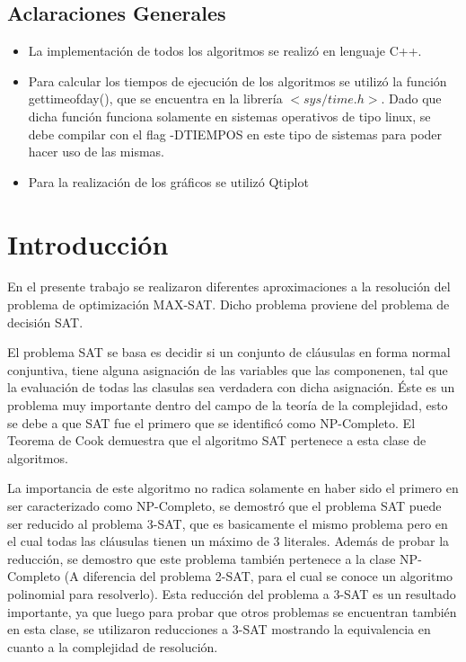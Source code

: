 \documentclass[a4paper,10pt]{article}
\begin{document}
\tableofcontents

\newpage


\begin{center}
\section*{Aclaraciones Generales}

\begin{itemize}
\item La implementación de todos los algoritmos se realizó en lenguaje C++.

\item Para calcular los tiempos de ejecución de los algoritmos se utilizó la función gettimeofday(), que se encuentra en la librería $<sys/time.h>$. Dado que dicha función funciona solamente en sistemas operativos de tipo linux, se debe compilar con el flag -DTIEMPOS en este tipo de sistemas para poder hacer uso de las mismas.

\item Para la realización de los gráficos se utilizó Qtiplot
\end{itemize}

\end{center}

\newpage

\section*{Introducci\'on}

En el presente trabajo se realizaron diferentes aproximaciones a la resoluci\'on del problema de optimizaci\'on MAX-SAT. Dicho problema proviene del problema de decisi\'on SAT. 

El problema SAT se basa es decidir si un conjunto de cl\'ausulas en forma normal conjuntiva, tiene alguna asignaci\'on de las variables que las componenen, tal que la evaluaci\'on de todas las clasulas sea verdadera con dicha asignaci\'on. \'Este es un problema muy importante dentro del campo de la teor\'ia de la complejidad, esto se debe a que SAT fue el primero que se identific\'o como NP-Completo. El Teorema de Cook demuestra que el algoritmo SAT pertenece a esta clase de algoritmos.

La importancia de este algoritmo no radica solamente en haber sido el primero en ser caracterizado como NP-Completo, se demostr\'o que el problema SAT puede ser reducido al problema 3-SAT, que es basicamente el mismo problema pero en el cual todas las cl\'ausulas tienen un m\'aximo de 3 literales. Adem\'as de probar la reducci\'on, se demostro que este problema tambi\'en pertenece a la clase NP-Completo (A diferencia del problema 2-SAT, para el cual se conoce un algoritmo polinomial para resolverlo). Esta reducci\'on del problema a 3-SAT es un resultado importante, ya que luego para probar que otros problemas se encuentran tambi\'en en esta clase, se utilizaron reducciones a 3-SAT mostrando la equivalencia en cuanto a la complejidad de resoluci\'on.
\end{document}
